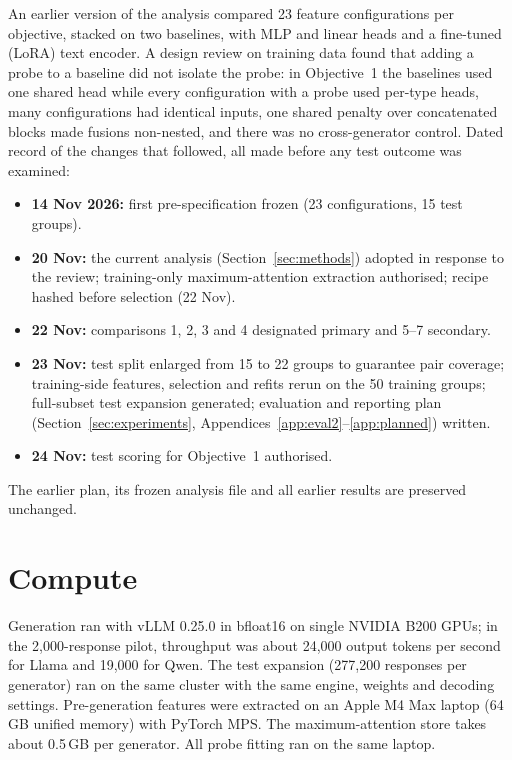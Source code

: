 \documentclass{article}
\begin{document}
An earlier version of the analysis compared 23 feature configurations per objective, stacked on two baselines, with MLP
and linear heads and a fine-tuned (LoRA) text encoder. A design review on training data found that adding a probe to a
baseline did not isolate the probe: in Objective~1 the baselines used one shared head while every configuration with a
probe used per-type heads, many configurations had identical inputs, one shared penalty over concatenated blocks made
fusions non-nested, and there was no cross-generator control. Dated record of the changes that followed, all made
before any test outcome was examined:
\begin{itemize}
\item \textbf{14 Nov 2026:} first pre-specification frozen (23 configurations, 15 test groups).
\item \textbf{20 Nov:} the current analysis (Section~\ref{sec:methods}) adopted in response to the review; training-only
maximum-attention extraction authorised; recipe hashed before selection (22 Nov).
\item \textbf{22 Nov:} comparisons 1, 2, 3 and 4 designated primary and 5--7 secondary.
\item \textbf{23 Nov:} test split enlarged from 15 to 22 groups to guarantee pair coverage; training-side features,
selection and refits rerun on the 50 training groups; full-subset test expansion generated; evaluation and reporting
plan (Section~\ref{sec:experiments}, Appendices~\ref{app:eval2}--\ref{app:planned}) written.
\item \textbf{24 Nov:} test scoring for Objective~1 authorised.
\end{itemize}
The earlier plan, its frozen analysis file and all earlier results are preserved unchanged.

\section{Compute}
\label{app:compute}

Generation ran with vLLM 0.25.0 in bfloat16 on single NVIDIA B200 GPUs; in the 2,000-response pilot, throughput was
about 24,000 output tokens per second for Llama and 19,000 for Qwen. The test expansion (277,200 responses per
generator) ran on the same cluster with the same engine, weights and decoding settings. Pre-generation features were extracted on an Apple
M4 Max laptop (64\,GB unified memory) with PyTorch MPS. The maximum-attention store takes about 0.5\,GB per generator.
All probe fitting ran on the same laptop.
\end{document}
